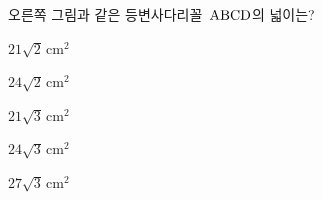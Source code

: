 \noindent\begin{minipage}[t]{0.58\linewidth}\vspace{0pt}\raggedright 오른쪽 그림과 같은 등변사다리꼴~$\mathrm{ABCD}$의 넓이는?\end{minipage}\hfill\begin{minipage}[t]{0.4\linewidth}\vspace{0pt}\centering \resizebox{\ifdim\width>\linewidth\linewidth\else\width\fi}{!}{}\end{minipage}\par
\begin{choicesv}{\rule[-3ex]{0pt}{8ex}$21\sqrt{2}\,\mathrm{cm}^2$}{\rule[-3ex]{0pt}{8ex}$24\sqrt{2}\,\mathrm{cm}^2$}{\rule[-3ex]{0pt}{8ex}$21\sqrt{3}\,\mathrm{cm}^2$}{\rule[-3ex]{0pt}{8ex}$24\sqrt{3}\,\mathrm{cm}^2$}{\rule[-3ex]{0pt}{8ex}$27\sqrt{3}\,\mathrm{cm}^2$}\end{choicesv}
